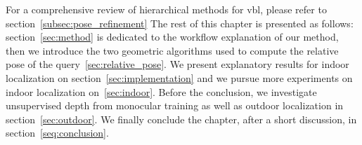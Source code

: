 For a comprehensive review of hierarchical methods for \ac{vbl}, please refer to section~\ref{subsec:pose_refinement} The rest of this chapter is presented as follows: section~\ref{sec:method} is dedicated to the workflow explanation of our method, then we introduce the two geometric algorithms used to compute the relative pose of the query~\ref{sec:relative_pose}. We present explanatory results for indoor localization on section~\ref{sec:implementation} and we pursue more experiments on indoor localization on~\ref{sec:indoor}. Before the conclusion, we investigate unsupervised depth from monocular training as well as outdoor localization in section~\ref{sec:outdoor}. We finally conclude the chapter, after a short discussion, in section~\ref{seq:conclusion}.

